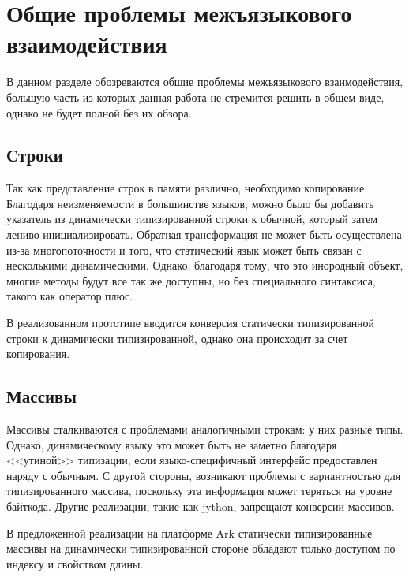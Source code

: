 \documentclass[times
]{itmo-student-thesis}
\begin{document}
\section{Общие проблемы межъязыкового взаимодействия}
В данном разделе обозреваются общие проблемы межъязыкового взаимодействия, большую часть из которых данная работа не стремится решить в общем виде, однако не будет полной без их обзора.

\subsection{Строки}
Так как представление строк в памяти различно, необходимо копирование. Благодаря неизменяемости в большинстве языков, можно было бы добавить указатель из динамически типизированной строки к обычной, который затем лениво инициализировать. Обратная трансформация не может быть осуществлена из-за многопоточности и того, что статический язык может быть связан с несколькими динамическими. Однако, благодаря тому, что это инородный объект, многие методы будут все так же доступны, но без специального синтаксиса, такого как оператор плюс.

В реализованном прототипе вводится конверсия статически типизированной строки к динамически типизированной, однако она происходит за счет копирования.

\subsection{Массивы}
Массивы сталкиваются с проблемами аналогичными строкам: у них разные типы. Однако, динамическому языку это может быть не заметно благодаря <<утиной>> типизации, если языко-специфичный интерфейс предоставлен наряду с обычным. С другой стороны, возникают проблемы с вариантностью для типизированного массива, поскольку эта информация может теряться на уровне байткода. Другие реализации, такие как jython, запрещают конверсии массивов.

В предложенной реализации на платформе Ark статически типизированные массивы на динамически типизированной стороне обладают только доступом по индексу и свойством длины.
\end{document}
